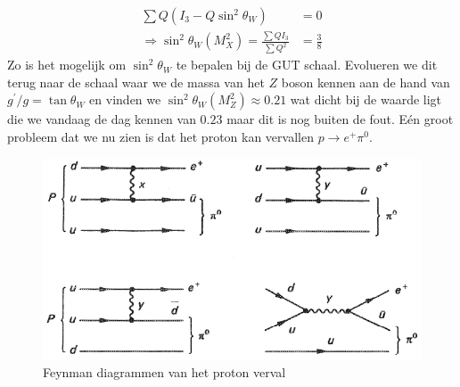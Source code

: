 \documentclass[../main.tex]{subfiles}
\begin{document}
\begin{equation}
    \begin{aligned}
        \label{eq:z_to_gamma_gut}
        \sum Q\left(I_{3}-Q \sin ^{2} \theta_{W}\right) &=0 \\
        \Rightarrow \sin ^{2} \theta_{W}\left(M_{X}^{2}\right)=\frac{\sum Q I_{3}}{\sum Q^{2}} &=\frac{3}{8}
    \end{aligned}
\end{equation}
Zo is het mogelijk om $\sin^2\theta_W$ te bepalen bij de GUT schaal. Evolueren we dit terug naar de schaal waar we de massa van het $Z$ boson kennen aan de hand van $g^{\prime} / g=\tan \theta_{W}$ en vinden we $\sin ^{2} \theta_{W}\left(M_{Z}^{2}\right) \approx 0.21$ wat dicht bij de waarde ligt die we vandaag de dag kennen van $0.23$ maar dit is nog buiten de fout. Eén groot probleem dat we nu zien is dat het proton kan vervallen $p \rightarrow e^{+} \pi^{0}$.

\begin{figure}[h]
    \centering
    \includegraphics[width=0.6\linewidth]{physics_beyond_the_standard_model/proton_verval.png}
    \caption{Feynman diagrammen van het proton verval}%
    \label{fig:physics_beyond_the_standard_model/proton_verval}
\end{figure}
\end{document}

